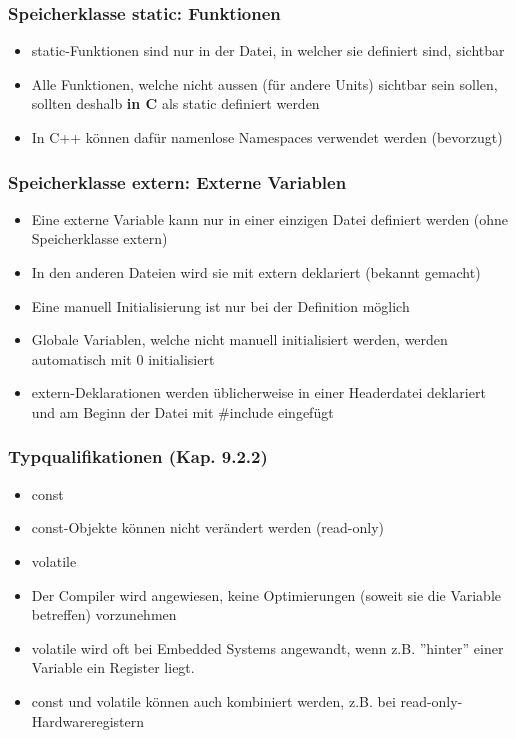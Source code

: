 \subsubsection{Speicherklasse static: Funktionen\hfill}
\label{sec:Speicherklasse static: Funktionen}
\begin{itemize}
	\item static-Funktionen sind nur in der Datei, in welcher sie definiert sind, sichtbar
	\item Alle Funktionen, welche nicht aussen (für andere Units) sichtbar sein sollen, sollten deshalb \textbf{in C} als static definiert werden\color{\ownRed}
	\item In C++ können dafür namenlose Namespaces verwendet werden (bevorzugt)\color{black}
\end{itemize}

\subsubsection{Speicherklasse extern: Externe Variablen\hfill}
\label{sec:Speicherklasse extern: Externe Variablen}
\begin{itemize}
	\item Eine externe Variable kann nur in einer einzigen Datei definiert werden (ohne Speicherklasse extern)
	\item In den anderen Dateien wird sie mit extern deklariert (bekannt gemacht)
	\item Eine manuell Initialisierung ist nur bei der Definition möglich
	\item Globale Variablen, welche nicht manuell initialisiert werden, werden automatisch mit 0 initialisiert
	\item extern-Deklarationen werden üblicherweise in einer Headerdatei deklariert und am Beginn der Datei mit \#include eingefügt
\end{itemize}

\subsubsection{Typqualifikationen (Kap. 9.2.2)\hfill}
\label{sec:Typqualifikationen (Kap. 9.2.2)}
\begin{itemize}
	\item const
	\item[\-] const-Objekte können nicht verändert werden (read-only)
	\item volatile
	\item[\-]Der Compiler wird angewiesen, keine Optimierungen (soweit sie die Variable betreffen) vorzunehmen
	\item volatile wird oft bei Embedded Systems angewandt, wenn z.B. ''hinter'' einer Variable ein Register liegt.
	\item const und volatile können auch kombiniert werden, z.B. bei read-only-Hardwareregistern
\end{itemize}

